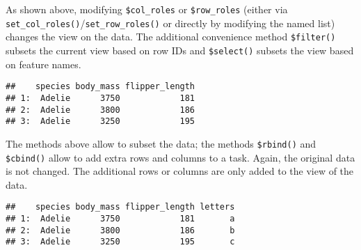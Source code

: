 \documentclass[
]{scrbook}
\newenvironment{Shaded}{\begin{snugshade}}{\end{snugshade}}
\newcommand{\AttributeTok}[1]{\textcolor[rgb]{0.77,0.63,0.00}{#1}}
\newcommand{\CommentTok}[1]{\textcolor[rgb]{0.56,0.35,0.01}{\textit{#1}}}
\newcommand{\DecValTok}[1]{\textcolor[rgb]{0.00,0.00,0.81}{#1}}
\newcommand{\FunctionTok}[1]{\textcolor[rgb]{0.00,0.00,0.00}{#1}}
\newcommand{\NormalTok}[1]{#1}
\newcommand{\OtherTok}[1]{\textcolor[rgb]{0.56,0.35,0.01}{#1}}
\newcommand{\SpecialCharTok}[1]{\textcolor[rgb]{0.00,0.00,0.00}{#1}}
\newcommand{\StringTok}[1]{\textcolor[rgb]{0.31,0.60,0.02}{#1}}
\renewenvironment{Shaded} {\begin{snugshade}\small} {\end{snugshade}}
\begin{document}
As shown above, modifying \texttt{\$col\_roles} or \texttt{\$row\_roles} (either via \texttt{set\_col\_roles()}/\texttt{set\_row\_roles()} or directly by modifying the named list) changes the view on the data.
The additional convenience method \texttt{\$filter()} subsets the current view based on row IDs and \texttt{\$select()} subsets the view based on feature names.

\begin{Shaded}
\end{Shaded}

\begin{verbatim}
##    species body_mass flipper_length
## 1:  Adelie      3750            181
## 2:  Adelie      3800            186
## 3:  Adelie      3250            195
\end{verbatim}

The methods above allow to subset the data; the methods \texttt{\$rbind()} and \texttt{\$cbind()} allow to add extra rows and columns to a task.
Again, the original data is not changed.
The additional rows or columns are only added to the view of the data.

\begin{Shaded}
\end{Shaded}

\begin{verbatim}
##    species body_mass flipper_length letters
## 1:  Adelie      3750            181       a
## 2:  Adelie      3800            186       b
## 3:  Adelie      3250            195       c
\end{verbatim}
\end{document}

